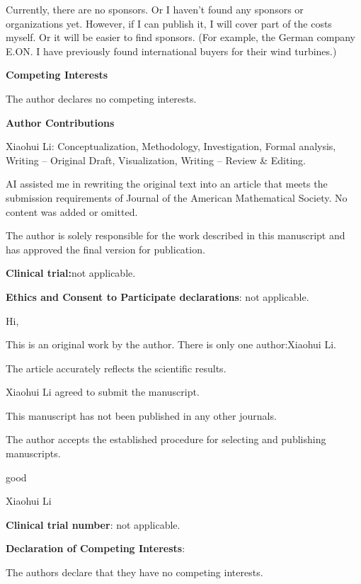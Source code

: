 \documentclass[12pt,a4paper]{article}
\begin{document}
Currently, there are no sponsors. Or I haven't found any sponsors or organizations yet. However, if I can publish it, I will cover part of the costs myself. Or it will be easier to find sponsors. (For example, the German company E.ON. I have previously found international buyers for their wind turbines.)

 \textbf{\textbf{Competing Interests}}

The author declares no competing interests.

 \textbf{\textbf{Author Contributions}}

Xiaohui Li: Conceptualization, Methodology, Investigation, Formal analysis, Writing – Original Draft, Visualization, Writing – Review \& Editing.

AI assisted me in rewriting the original text into an article that meets the submission requirements of Journal of the American Mathematical Society. No content was added or omitted.

 The author is solely responsible for the work described in this manuscript and has approved the final version for publication.

 \textbf{\textbf{Clinical trial:}}not applicable.

 \textbf{\textbf{Ethics and Consent to Participate declarations}}: not applicable.

 Hi,

This is an original work by the author. There is only one author:Xiaohui Li.

The article accurately reflects the scientific results.

Xiaohui Li agreed to submit the manuscript.

This manuscript has not been published in any other journals.

The author accepts the established procedure for selecting and publishing manuscripts.

good

Xiaohui Li



 \textbf{\textbf{Clinical trial number}}: not applicable.
 
 \textbf{\textbf{Declaration of Competing Interests}}: 

The authors declare that they have no competing interests.
\end{document}
